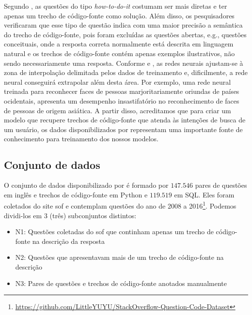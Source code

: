 Segundo \cite{yao-2018}, as questões do tipo \textit{how-to-do-it} costumam ser mais diretas e ter apenas um trecho de código-fonte como solução. Além disso, os pesquisadores verificaram que esse tipo de questão indica com uma maior precisão a semântica do trecho de código-fonte, pois foram excluídas as questões abertas, e.g., questões conceituais, onde a resposta correta normalmente está descrita em linguagem natural e os trechos de código-fonte contém apenas exemplos ilustrativos, não sendo necessariamente uma resposta. Conforme \cite{yao-2018} e \cite{hasson-direct-fit-to-nature-evolutionary-perspective-ann:2020}, as redes neurais ajustam-se à zona de interpolação delimitada pelos dados de treinamento e, dificilmente, a rede neural conseguirá extrapolar além desta área. Por exemplo, uma rede neural treinada para reconhecer faces de pessoas marjoritariamente oriundas de países ocidentais, apresenta um desempenho insastifatório no reconhecimento de faces de pessoas de origem asiática. A partir disso, acreditamos que para criar um modelo que recupere trechos de código-fonte que atenda às intenções de busca de um usuário, os dados disponibilizados por \cite{yao-2018} representam uma importante fonte de conhecimento para treinamento dos nossos modelos.


\subsection{Conjunto de dados}
\label{sec:conjunto-dados}

O conjunto de dados disponibilizado por \cite{yao-2018} é formado por $\bm{147.546}$ pares de questões em inglês e trechos de código-fonte em Python e $\bm{119.519}$ em SQL. Eles foram coletados do site \Gls{sof} e contemplam questões do ano de 2008 a 2016\footnote{\url{https://github.com/LittleYUYU/StackOverflow-Question-Code-Dataset}}. Podemos dividi-los em 3 (três) subconjuntos distintos:

\begin{itemize}
    \item N1: Questões coletadas do \Gls{sof} que continham apenas um trecho de código-fonte na descrição da resposta
    \item N2: Questões que apresentavam mais de um trecho de código-fonte na descrição
    \item N3: Pares de questões e trechos de código-fonte anotados manualmente
\end{itemize}



